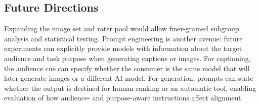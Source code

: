 \documentclass[conference]{IEEEtran}
\begin{document}
\subsection{Future Directions}
Expanding the image set and rater pool would allow finer-grained subgroup analysis and statistical testing.
Prompt engineering is another avenue: future experiments can explicitly provide models with information about the target audience and task purpose when generating captions or images. For captioning, the audience cue can specify whether the consumer is the same model that will later generate images or a different AI model. For generation, prompts can state whether the output is destined for human ranking or an automatic tool, enabling evaluation of how audience- and purpose-aware instructions affect alignment.
\end{document}
